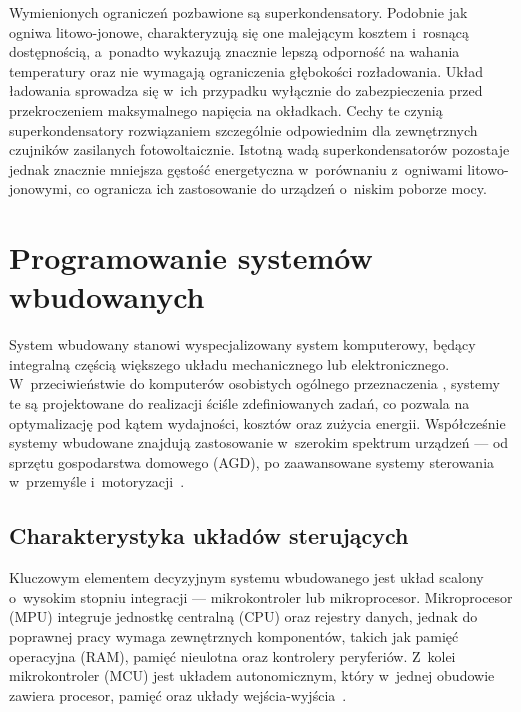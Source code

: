 Wymienionych ograniczeń pozbawione są superkondensatory. Podobnie 
jak ogniwa litowo-jonowe, charakteryzują się one malejącym kosztem 
i~rosnącą dostępnością, a~ponadto wykazują znacznie lepszą odporność 
na wahania temperatury \cite{Comparing_Supercapacitors_to_Lithium-Ion_Batteries} 
oraz nie wymagają ograniczenia głębokości 
rozładowania. Układ ładowania sprowadza się w~ich przypadku wyłącznie 
do zabezpieczenia przed przekroczeniem maksymalnego napięcia na 
okładkach. Cechy te czynią superkondensatory rozwiązaniem szczególnie 
odpowiednim dla zewnętrznych czujników zasilanych fotowoltaicznie.
Istotną wadą superkondensatorów pozostaje jednak znacznie mniejsza 
gęstość energetyczna w~porównaniu z~ogniwami litowo-jonowymi, co 
ogranicza ich zastosowanie do urządzeń o~niskim poborze mocy.

\chapter{Programowanie systemów wbudowanych}
System wbudowany  stanowi 
wyspecjalizowany system komputerowy, będący integralną częścią 
większego układu mechanicznego lub elektronicznego. 
W~przeciwieństwie do komputerów osobistych ogólnego przeznaczenia 
, systemy te są projektowane 
do realizacji ściśle zdefiniowanych zadań, co pozwala na optymalizację 
pod kątem wydajności, kosztów oraz zużycia energii. 
Współcześnie systemy wbudowane znajdują zastosowanie w~szerokim 
spektrum urządzeń --- od sprzętu gospodarstwa domowego (AGD), 
po zaawansowane systemy sterowania w~przemyśle 
i~motoryzacji~\cite{Programming_Embedded_Systems}.

\section{Charakterystyka układów sterujących}
Kluczowym elementem decyzyjnym systemu wbudowanego jest układ scalony 
o~wysokim stopniu integracji --- mikrokontroler lub mikroprocesor. 
Mikroprocesor (MPU) integruje jednostkę centralną (CPU) oraz rejestry 
danych, jednak do poprawnej pracy wymaga zewnętrznych komponentów, 
takich jak pamięć operacyjna (RAM), pamięć nieulotna oraz kontrolery 
peryferiów. Z~kolei mikrokontroler (MCU) jest układem autonomicznym, 
który w~jednej obudowie zawiera procesor, pamięć oraz układy 
wejścia-wyjścia~\cite{2024PodstawySystemowWbudowanych}.

